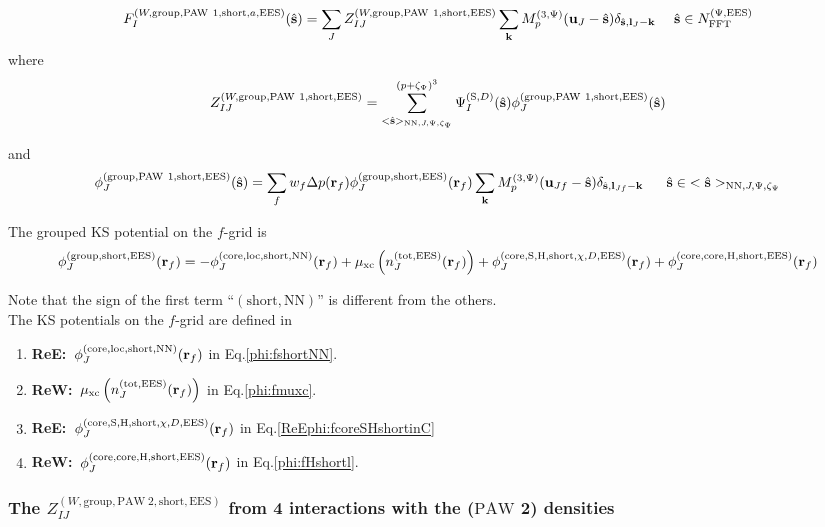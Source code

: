 \documentclass[paper=a4, fontsize=11pt]{article} %
\numberwithin{equation}{section} %
\numberwithin{figure}{section} %
\numberwithin{table}{section} %
\newcommand{\bu}{{\bf{u}}}
\newcommand{\bl}{{\bf{l}}}
\newcommand{\bk}{{\bf{k}}}
\newcommand{\bs}{{\bf{s}}}
\newcommand{\br}{{\bf{r}}}
\newcommand{\hs}{{\hat{\bf{s}}}}
\newcommand{\rS}{{\mathrm{S}}}
\newcommand{\rEES}{{\mathrm{EES}}}
\newcommand{\rxc}{{\mathrm{xc}}}
\newcommand{\rgr}{{\mathrm{group}}}
\newcommand{\rcore}{{\mathrm{core}}}
\newcommand{\rNN}{{\mathrm{NN}}}
\newcommand{\rshort}{{\mathrm{short}}}
\newcommand{\rP}{{\mathrm{PAW}}}
\newcommand{\rH}{{\mathrm{H}}}
\newcommand{\rlo}{{\mathrm{loc}}}
\newcommand{\rtot}{{\mathrm{tot}}}
\newcommand{\NFFTpEES}{{N^{\mathrm{(\Psi,\rEES})}_{\mathrm{FFT}}}}
\newcommand{\Mp}{{M_p^{(3,\Psi)}}}
\newcommand{\pzp}{{(p+\zeta_{\Psi})^3}}
\newcommand{\hsJp}{{<\hs>_{\rNN,J,\Psi,\zeta_\Psi}}}
\newcommand{\hsinJp}{{\ \ \ \ \ \hs  \in  \hsJp}}
\newcommand{\hsinpEES}{{\ \ \ \ \hs \in \NFFTpEES}}
\newcommand{\ReE}{{{\bf ReE:\ }}}
\newcommand{\ReW}{{{\bf ReW:\ }}}
\begin{document}
\begin{equation}
F_I^{(W,\rgr,\rP\ 1,\rshort,a,\rEES)}(\hs) = \sum_J Z_{IJ}^{(W,\rgr,\rP\ 1,\rshort,\rEES)}\sum_{\bk} \Mp(\bu_{J}-\hat \bs) \delta_{\hat \bs,\bl_J-\bk} \hsinpEES \\
\end{equation}
where
\begin{equation}
\label{FIJ:short1}
Z_{IJ}^{(W,\rgr,\rP\ 1,\rshort,\rEES)} = \sum_{\hsJp}^{\pzp} \Psi_{I}^{(\rS,D)}(\hat \bs) \phi_J^{(\rgr,\rP\ 1,\rshort,\rEES)}(\hs)\\
\end{equation}

and 
\begin{equation}
\label{gr:phishort1}
\phi_J^{(\rgr,\rP\ 1,\rshort,\rEES)}(\hs) = \sum_f w_f \Delta p(\br_f) \phi_J^{(\rgr,\rshort,\rEES)}(\br_f)  \sum_{\bk} \Mp(\bu_{Jf}-\hat \bs)\delta_{\hat \bs,\bl_{Jf}-\bk} \hsinJp 
\end{equation}

The grouped KS potential on the $f$-grid is
\begin{equation}\label{gr:groupedshortrf}
\phi_J^{(\rgr,\rshort,\rEES)}(\br_f) = -\phi_J^{(\rcore,\rlo,\rshort,\rNN)}(\br_f) + \mu_{\rxc}\left(n_J^{(\rtot,\rEES)}(\br_f)\right) + \phi_J^{(\rcore,\rS,\rH,\rshort,\chi,D,\rEES)}(\br_f) + \phi_J^{(\rcore,\rcore,\rH,\rshort,\rEES)}(\br_f)
\end{equation}

Note that the sign of the first term ``$(\rshort,\rNN)$'' is different from the others.\\

The KS potentials on the $f$-grid are defined in
\begin{enumerate}
\item \ReE $\phi_J^{(\rcore,\rlo,\rshort,\rNN)}(\br_f)$ in Eq.\eqref{phi:fshortNN}.
\item \ReW $\mu_{\rxc}\left(n_J^{(\rtot,\rEES)}(\br_f)\right)$ in Eq.\eqref{phi:fmuxc}.
\item \ReE $\phi_J^{(\rcore,\rS,\rH,\rshort,\chi,D,\rEES)}(\br_f)$ in Eq.\eqref{ReEphi:fcoreSHshortinC}
\item \ReW $\phi_J^{(\rcore,\rcore,\rH,\rshort,\rEES)}(\br_f)$ in Eq.\eqref{phi:fHshortl}.
\end{enumerate}


\subsubsection{The $Z_{IJ}^{(W,\rgr,\rP\ 2,\rshort,\rEES)}$ from 4 interactions with the ($\rP$ 2) densities}
\end{document}
